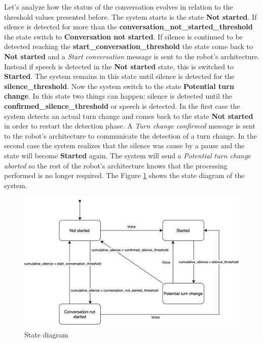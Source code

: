\documentclass[../main.tex]{subfiles}
\begin{document}
Let's analyze how the status of the conversation evolves in relation to the threshold values presented before. The system starts is the state \textbf{Not started}. If silence is detected for more than the \textbf{conversation\_not\_started\_threshold} the state switch to \textbf{Conversation not started}. If silence is continued to be detected reaching the \textbf{start\_conversation\_threshold} the state come back to \textbf{Not started} and a \textit{Start conversation} message is sent to the robot's architecture. Instead if speech is detected in the \textbf{Not started} state, this is switched to \textbf{Started}. The system remains in this state until silence is detected for the \textbf{silence\_threshold}. Now the system switch to the state \textbf{Potential turn change}. In this state two things can happen: silence is detected until the \textbf{confirmed\_silence\_threshold} or speech is detected. In the first case the system detects an actual turn change and comes back to the state \textbf{Not started} in order to restart the detection phase. A \textit{Turn change confirmed} message is sent to the robot's architecture to communicate the detection of a turn change. In the second case the system realizes that the silence was cause by a pause and the state will become \textbf{Started} again. The system will send a \textit{Potential turn change aborted} so the rest of the robot's architecture knows that the processing performed is no longer required. The Figure \ref{fig:state diagram} shows the state diagram of the system.

\begin{figure}[ht]
    \centering
    \includegraphics[width=\textwidth]{images/State diagram.png}
    \caption{State diagram}
    \label{fig:state diagram}
\end{figure}
\end{document}
